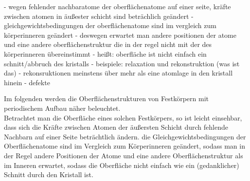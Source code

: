 - wegen fehlender nachbaratome der oberflächenatome auf einer seite, kräfte zwischen atomen in äußester
 schicht sind beträchlich geändert
 - gleichgewichtsbedingungen der oberflächenatome sind im vergleich zum körperinneren geändert
 - deswegen erwartet man andere positionen der atome und eine andere oberflächenstruktur die in der regel
 nicht mit der des körperinneren übereinstimmt
 - heißt: oberfläche ist nicht einfach ein schnitt/abbruch des kristalls
 - beispiele: relaxation und rekonstruktion (was ist das)
 - rekonsruktionen meinstens über mehr als eine atomlage in den kristall hinein 
 - defekte
 
 Im folgenden werden die Oberflächenstrukturen von Festkörpern mit periodischem Aufbau näher
 beleuchtet. \\
 Betrachtet man die Oberfläche eines solchen Festkörpers, so ist leicht einsehbar, dass sich die
 Kräfte zwischen Atomen der äußersten Schicht durch fehlende Nachbarn auf einer Seite beträchtlich
 ändern. die Gleichgewichtsbedingungen der Oberflächenatome sind im Vergleich zum Körperinneren
 geändert, sodass man in der Regel andere Positionen der Atome und eine andere Oberflächenstruktur
 als im Inneren erwartet, sodass die Oberfläche nicht einfach wie ein (gedanklicher) Schnitt durch
 den Kristall ist.\\
 
